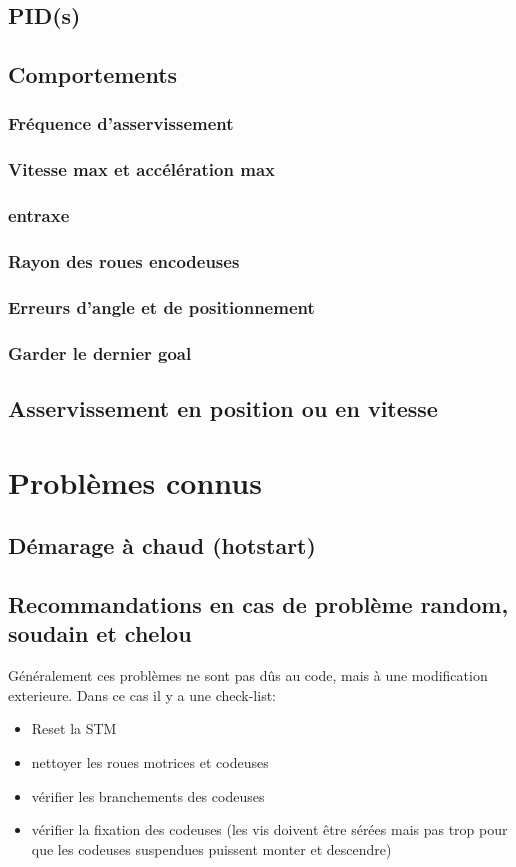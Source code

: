 \documentclass{article}
\begin{document}
			\subsection{PID(s)}
			\subsection{Comportements}
				\subsubsection{Fréquence d'asservissement}
				\subsubsection{Vitesse max et accélération max}
				\subsubsection{entraxe}
				\subsubsection{Rayon des roues encodeuses}
				\subsubsection{Erreurs d'angle et de positionnement}
				\subsubsection{Garder le dernier goal}
				\subsection{Asservissement en position ou en vitesse}

		\section{Problèmes connus}
			
			\subsection{Démarage à chaud (hotstart)}
			\subsection{Recommandations en cas de problème random, soudain et chelou}
				Généralement ces problèmes ne sont pas dûs au code, mais à une modification exterieure. Dans ce cas il y a une check-list:
				\begin{itemize}
					\item Reset la STM
					\item nettoyer les roues motrices et codeuses
					\item vérifier les branchements des codeuses
					\item vérifier la fixation des codeuses (les vis doivent être sérées mais pas trop pour que les codeuses suspendues puissent monter et descendre)
				\end{itemize}
\end{document}
